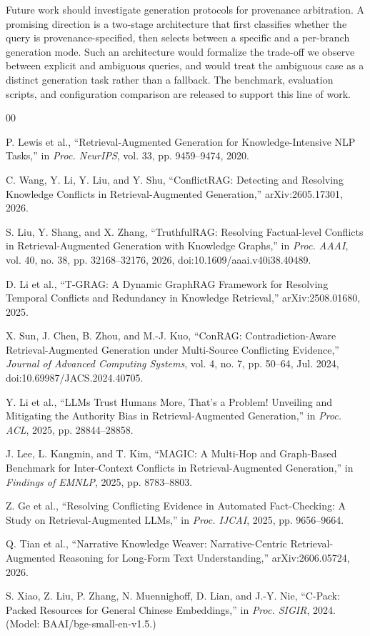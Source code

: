 \documentclass[conference]{IEEEtran}
\begin{document}
Future work should investigate generation protocols for provenance arbitration. A promising direction is a two-stage architecture that first classifies whether the query is provenance-specified, then selects between a specific and a per-branch generation mode. Such an architecture would formalize the trade-off we observe between explicit and ambiguous queries, and would treat the ambiguous case as a distinct generation task rather than a fallback. The benchmark, evaluation scripts, and configuration comparison are released to support this line of work.

\begin{thebibliography}{00}

 P. Lewis et al., ``Retrieval-Augmented Generation for Knowledge-Intensive NLP Tasks,'' in \textit{Proc. NeurIPS}, vol. 33, pp. 9459--9474, 2020.

 C. Wang, Y. Li, Y. Liu, and Y. Shu, ``ConflictRAG: Detecting and Resolving Knowledge Conflicts in Retrieval-Augmented Generation,'' arXiv:2605.17301, 2026.

 S. Liu, Y. Shang, and X. Zhang, ``TruthfulRAG: Resolving Factual-level Conflicts in Retrieval-Augmented Generation with Knowledge Graphs,'' in \textit{Proc. AAAI}, vol. 40, no. 38, pp. 32168--32176, 2026, doi:10.1609/aaai.v40i38.40489.

 D. Li et al., ``T-GRAG: A Dynamic GraphRAG Framework for Resolving Temporal Conflicts and Redundancy in Knowledge Retrieval,'' arXiv:2508.01680, 2025.

 X. Sun, J. Chen, B. Zhou, and M.-J. Kuo, ``ConRAG: Contradiction-Aware Retrieval-Augmented Generation under Multi-Source Conflicting Evidence,'' \textit{Journal of Advanced Computing Systems}, vol. 4, no. 7, pp. 50--64, Jul. 2024, doi:10.69987/JACS.2024.40705.

 Y. Li et al., ``LLMs Trust Humans More, That's a Problem! Unveiling and Mitigating the Authority Bias in Retrieval-Augmented Generation,'' in \textit{Proc. ACL}, 2025, pp. 28844--28858.

 J. Lee, L. Kangmin, and T. Kim, ``MAGIC: A Multi-Hop and Graph-Based Benchmark for Inter-Context Conflicts in Retrieval-Augmented Generation,'' in \textit{Findings of EMNLP}, 2025, pp. 8783--8803.

 Z. Ge et al., ``Resolving Conflicting Evidence in Automated Fact-Checking: A Study on Retrieval-Augmented LLMs,'' in \textit{Proc. IJCAI}, 2025, pp. 9656--9664.

 Q. Tian et al., ``Narrative Knowledge Weaver: Narrative-Centric Retrieval-Augmented Reasoning for Long-Form Text Understanding,'' arXiv:2606.05724, 2026.

 S. Xiao, Z. Liu, P. Zhang, N. Muennighoff, D. Lian, and J.-Y. Nie, ``C-Pack: Packed Resources for General Chinese Embeddings,'' in \textit{Proc. SIGIR}, 2024. (Model: BAAI/bge-small-en-v1.5.)

\end{thebibliography}
\end{document}

